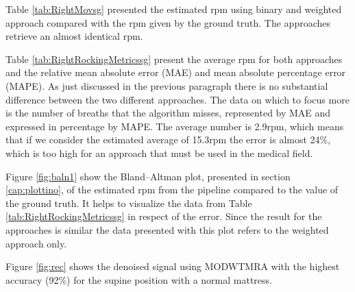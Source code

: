 Table \ref{tab:RightMovsg} presented the estimated rpm using binary and weighted approach compared with the rpm given by the ground truth. The approaches retrieve an almost identical rpm. 

\vspace{0.5cm}


Table \ref{tab:RightRockingMetricssg} present the average rpm for both approaches  
and the relative mean absolute error (MAE) and mean absolute percentage error (MAPE). As just discussed in the previous paragraph there is no substantial difference between the two different approaches. The data on which to focus more is the number of breaths that the algorithm misses, represented by MAE and expressed in percentage by MAPE. The average number is 2.9rpm, which means that if we consider the estimated average of 15.3rpm the error is almost 24\%, which is too high for an approach that must be used in the medical field.



Figure \ref{fig:baln1} show the Bland–Altman plot, presented in section \ref{cap:plottino}, of the estimated rpm from the pipeline compared to the value of the ground truth. It helps to visualize the data from Table \ref{tab:RightRockingMetricssg} in respect of the error. Since the result for the approaches is similar the data presented with this plot refers to the weighted approach only.

Figure \ref{fig:rec} shows the denoised signal using MODWTMRA with the highest accuracy (92\%) for the supine position with a normal mattress.

